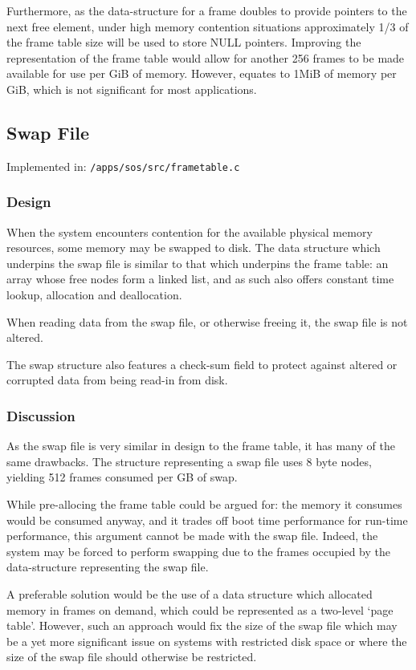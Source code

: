 \documentclass[a4paper,12pt]{article}
\begin{document}
Furthermore, as the data-structure for a frame doubles to provide pointers to
the next free element, under high memory contention situations approximately
1/3 of the frame table size will be used to store NULL pointers.  Improving
the representation of the frame table would allow for another 256 frames to be
made available for use per GiB of memory.  However, equates to 1MiB of memory
per GiB, which is not significant for most applications.

\subsection{Swap File}
Implemented in: \texttt{/apps/sos/src/frametable.c}

\subsubsection{Design}
When the system encounters contention for the available physical memory
resources, some memory may be swapped to disk.  The data structure which
underpins the swap file is similar to that which underpins the frame table: an
array whose free nodes form a linked list, and as such also offers constant
time lookup, allocation and deallocation.

When reading data from the swap file, or otherwise freeing it, the swap file
is not altered.

The swap structure also features a check-sum field to protect against altered
or corrupted data from being read-in from disk.

\subsubsection{Discussion}
As the swap file is very similar in design to the frame table, it has many of
the same drawbacks.  The structure representing a swap file uses 8 byte nodes,
yielding 512 frames consumed per GB of swap.

While pre-allocing the frame table could be argued for: the memory it consumes
would be consumed anyway, and it trades off boot time performance for run-time
performance, this argument cannot be made with the swap file.  Indeed, the
system may be forced to perform swapping due to the frames occupied by the
data-structure representing the swap file.

A preferable solution would be the use of a data structure which allocated
memory in frames on demand, which could be represented as a two-level `page
table'.  However, such an approach would fix the size of the swap file which
may be a yet more significant issue on systems with restricted disk space or
where the size of the swap file should otherwise be restricted.
\end{document}
